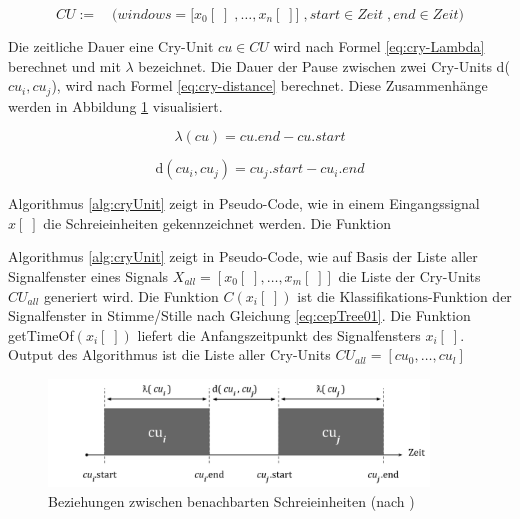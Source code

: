 \begin{equation}
CU := \quad \Big(windows = \big[x_0[\;] \; ,\ldots, x_n[\;] \big] \;, start \in Zeit \;, end \in Zeit \Big)
\label{eq:cry-Unit}
\end{equation}

Die zeitliche Dauer eine Cry-Unit $cu \in CU$ wird nach Formel \ref{eq:cry-Lambda} berechnet und mit $\lambda$ bezeichnet. Die Dauer der Pause zwischen zwei Cry-Units d($cu_i, cu_j$), wird nach Formel \ref{eq:cry-distance} berechnet. Diese Zusammenhänge werden in Abbildung \ref{img:cryUnit-details} visualisiert.\cite[S. 2]{vad_entropy}

\begin{equation}
\lambda (cu) = cu.end - cu.start
\label{eq:cry-Lambda}
\end{equation}

\begin{equation}
\text{d}(cu_i, cu_j) = cu_j.start - cu_i.end
\label{eq:cry-distance}
\end{equation}

Algorithmus \ref{alg:cryUnit} zeigt in Pseudo-Code, wie in einem Eingangssignal $x[\;]$ die Schreieinheiten   gekennzeichnet werden. Die Funktion 


Algorithmus \ref{alg:cryUnit} zeigt in Pseudo-Code, wie auf Basis der Liste aller Signalfenster eines Signals $X_{all} = [x_0[\;] ,\ldots, x_m[\;]]$ die Liste der Cry-Units $CU_{all}$ generiert wird. Die Funktion $C(x_i[\;])$ ist die Klassifikations-Funktion der Signalfenster in Stimme/Stille nach Gleichung \ref{eq:cepTree01}. Die Funktion getTimeOf$(x_i[\;])$ liefert die Anfangszeitpunkt des Signalfensters $x_i[\;]$. Output des Algorithmus ist die Liste aller Cry-Units $CU_{all} = [cu_0 , \ldots, cu_l]$

\begin{figure}[H]
	\centering
	\includegraphics[width=0.9\textwidth]{bilder/newSmoothing05.png}
	\caption[Beziehungen zwischen benachbarten Schreieinheiten]{Beziehungen zwischen benachbarten Schreieinheiten (nach \cite[S. 2]{vad_entropy})}
	\label{img:cryUnit-details}
\end{figure}

